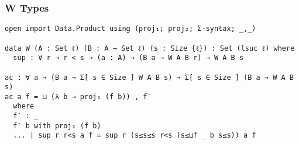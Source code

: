 \documentclass[acmsmall,review,anonymous]{acmart}\settopmatter{printfolios=true,printccs=false,printacmref=false}
\begin{document}
\subsubsection{W Types} \label{app:mechanization:agda:W}

\begin{verbatim}
open import Data.Product using (proj₁; proj₂; Σ-syntax; _,_)

data W (A : Set ℓ) (B : A → Set ℓ) (s : Size {ℓ}) : Set (lsuc ℓ) where
  sup : ∀ r → r < s → (a : A) → (B a → W A B r) → W A B s

ac : ∀ a → (B a → Σ[ s ∈ Size ] W A B s) → Σ[ s ∈ Size ] (B a → W A B s)
ac a f = ⊔ (λ b → proj₁ (f b)) , f′
  where
  f′ : _
  f′ b with proj₂ (f b)
  ... | sup r r<s a f = sup r (s≤s≤s r<s (s≤⊔f _ b s≤s)) a f
\end{verbatim}
\end{document}

